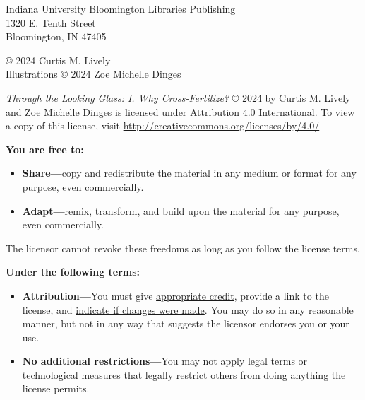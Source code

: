 \null\vfill
\begin{flushleft}
\thispagestyle{empty}
Indiana University Bloomington Libraries Publishing\\
1320 E. Tenth Street\\
Bloomington, IN 47405
\vspace{5mm}

© 2024 Curtis M. Lively\\
Illustrations © 2024 Zoe Michelle Dinges

\vspace{4mm}
\ccby

\textit{Through the Looking Glass: I. Why Cross-Fertilize?} © 2024 by Curtis M. Lively and Zoe Michelle Dinges is licensed under Attribution 4.0 International. To view a copy of this license, visit \url{http://creativecommons.org/licenses/by/4.0/}

\vspace{3mm}

\textbf{You are free to:}
\begin{itemize}
\tightlist
\item
  \textbf{Share---}copy and redistribute the material in any medium or format for any purpose, even commercially.\\
\item
  \textbf{Adapt---}remix, transform, and build upon the material for any purpose, even commercially.
\end{itemize}

The licensor cannot revoke these freedoms as long as you follow the license terms.

\vspace{3mm}

\textbf{Under the following terms:}
\begin{itemize}
\tightlist
\item
  \textbf{Attribution---}You must give
  \href{https://creativecommons.org/licenses/by/4.0/\#ref-appropriate-credit}{appropriate credit}, provide a link to the license, and
  \href{https://creativecommons.org/licenses/by/4.0/\#ref-indicate-changes}{indicate if changes were made}. You may do so in any reasonable manner, but not in any way that suggests the licensor endorses you or your use.\\
\item
  \textbf{No additional restrictions---}You may not apply legal terms or
  \href{https://creativecommons.org/licenses/by/4.0/\#ref-technological-measures}{technological measures} that legally restrict others from doing anything the license permits.
\end{itemize}


\end{flushleft}
